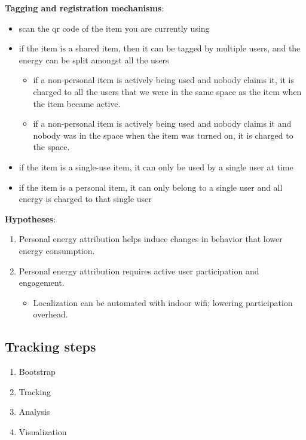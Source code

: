 {\bf Tagging and registration mechanisms}:
\begin{itemize}
\item scan the qr code of the item you are currently using
\item if the item is a shared item, then it can be tagged by multiple users, and the energy can be split amongst all the users
	\begin{itemize}
	\item if a non-personal item is actively being used and nobody claims it, it is charged to all the users that we were in the same space
			as the item when the item became active.
	\item if a non-personal item is actively being used and nobody claims it and nobody was in the space when the item was turned on, it is charged
			to the space.
	\end{itemize}
\item if the item is a single-use item, it can only be used by a single user at time
\item if the item is a personal item, it can only belong to a single user and all energy is charged to that single user \\
\end{itemize}


{\bf Hypotheses}:

\begin{enumerate}
\item Personal energy attribution helps induce changes in behavior that lower energy consumption.
\item Personal energy attribution requires active user participation and engagement.
	\begin{itemize}
	\item Localization can be automated with indoor wifi; lowering participation overhead.
	\end{itemize}
\end{enumerate}



\subsection{Tracking steps}

\begin{enumerate}
\item Bootstrap
\item Tracking
\item Analysis
\item Visualization
\end{enumerate}


